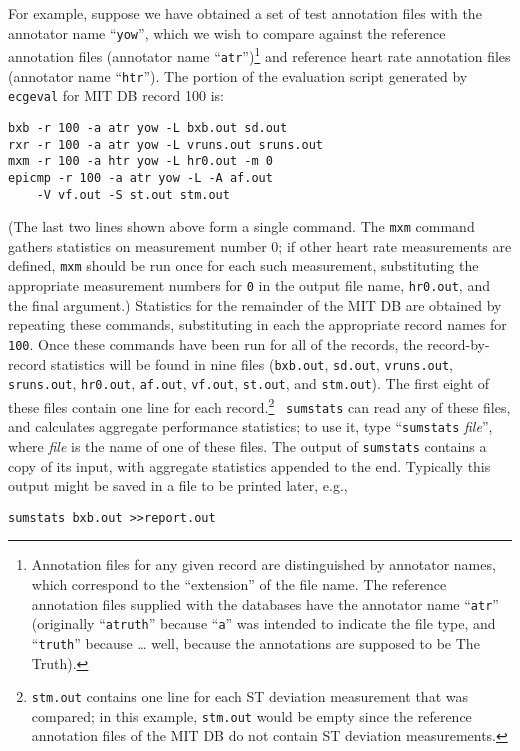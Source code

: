 \documentclass[twoside]{article}
\begin{document}
For example, suppose we have obtained a set of test annotation files with the
annotator name ``{\tt yow}'', which we wish to compare against the reference
annotation files (annotator name ``{\tt atr}'')\footnote{
Annotation files for any given record are distinguished by annotator names,
which correspond to the ``extension'' of the file name.  The
reference annotation files supplied with the databases have the annotator
name ``{\tt atr}'' (originally ``{\tt atruth}'' because ``{\tt a}''
was intended to indicate the file type, and ``{\tt truth}'' because \ldots
well, because the annotations are supposed to be The Truth).}
and reference heart rate annotation files (annotator name ``{\tt htr}'').
The portion of the evaluation script generated by {\tt ecgeval} for MIT DB
record 100 is:
\begin{verbatim}
bxb -r 100 -a atr yow -L bxb.out sd.out
rxr -r 100 -a atr yow -L vruns.out sruns.out
mxm -r 100 -a htr yow -L hr0.out -m 0
epicmp -r 100 -a atr yow -L -A af.out
    -V vf.out -S st.out stm.out
\end{verbatim}
(The last two lines shown above form a single command.  The {\tt mxm} command
gathers statistics on measurement number 0; if other heart rate measurements
are defined, {\tt mxm} should be run once for each such measurement,
substituting the appropriate measurement numbers for {\tt 0} in the output
file name, {\tt hr0.out}, and the final argument.)  Statistics for the
remainder of the MIT DB are obtained by repeating these commands, substituting
in each the appropriate record names for {\tt 100}.  Once these commands have
been run for all of the records, the record-by-record statistics will be found
in nine files ({\tt bxb.out}, {\tt sd.out}, {\tt vruns.out}, {\tt sruns.out},
{\tt hr0.out}, {\tt af.out}, {\tt vf.out}, {\tt st.out}, and {\tt stm.out}).
The first eight of these files contain one line for each record.\footnote{
{\tt stm.out} contains one line for each ST deviation measurement that was
compared; in this example, {\tt stm.out} would be empty since the reference
annotation files of the MIT DB do not contain ST deviation measurements.} {\tt
sumstats} can read any of these files, and calculates aggregate performance
statistics; to use it, type ``{\tt sumstats} {\it file}'', where {\it file} is
the name of one of these files.  The output of {\tt sumstats} contains a copy
of its input, with aggregate statistics appended to the end.  Typically this
output might be saved in a file to be printed later, e.g.,
\begin{verbatim}
sumstats bxb.out >>report.out
\end{verbatim}
\end{document}
